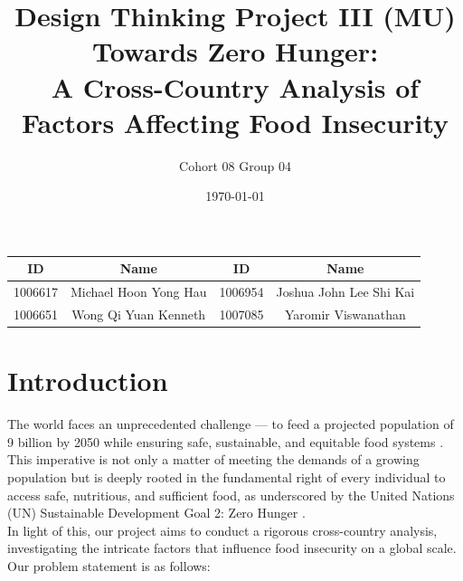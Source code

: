 \documentclass{article}
\title{\Bigg01.020 Design Thinking Project III (MU) \\ Towards Zero Hunger: \\ A Cross-Country Analysis of Factors Affecting Food Insecurity}
\author{Cohort 08 Group 04}
\date{\today}
\begin{document}
\maketitle
\thispagestyle{empty}

\begin{center}
\begin{tabular}{ |c|c|c|c| } 
 \hline
  ID & Name & ID & Name \\
 \hline
  1006617 & Michael Hoon Yong Hau & 1006954 & Joshua John Lee Shi Kai \\
 \hline
  1006651 & Wong Qi Yuan Kenneth & 1007085 & Yaromir Viswanathan \\
 \hline
\end{tabular}
\end{center} 



\tableofcontents
\thispagestyle{empty}

\newpage
\setcounter{page}{1}

\section{Introduction} 
The world faces an unprecedented challenge — to feed a projected population of 9 billion by 2050 while ensuring safe, sustainable, and equitable food systems \cite{doi:10.1126/science.1185383}. This imperative is not only a matter of meeting the demands of a growing population but is deeply rooted in the fundamental right of every individual to access safe, nutritious, and sufficient food, as underscored by the United Nations (UN) Sustainable Development Goal 2: Zero Hunger \cite{unsdg2}. \\

\noindent In light of this, our project aims to conduct a rigorous cross-country analysis, investigating the intricate factors that influence food insecurity on a global scale. Our problem statement is as follows: 
\end{document}
